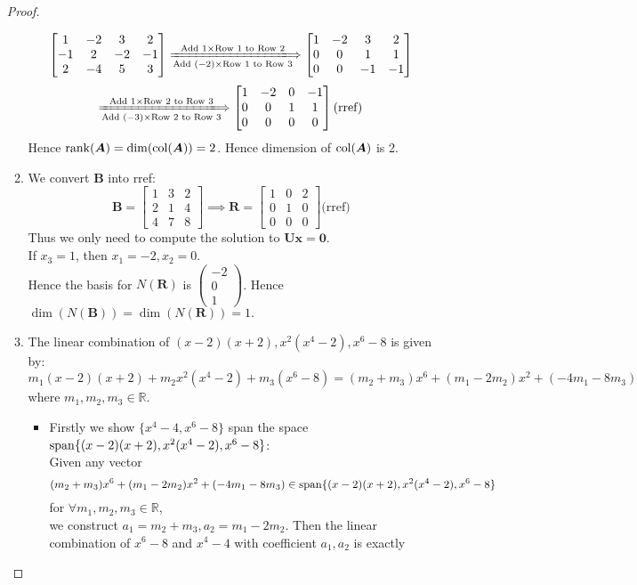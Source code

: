 \begin{enumerate}
\begin{proof}
\begin{enumerate}
\[\begin{bmatrix}
1&-2&3&2\\-1&2&-2&-1\\2&-4&5&3
\end{bmatrix}\xLongrightarrow[\text{Add $(-2)\times$Row 1 to Row 3}]{\text{Add $1\times$Row 1 to Row 2}}
\begin{bmatrix}
1&-2&3&2\\0&0&1&1\\0&0&-1&-1
\end{bmatrix}
\]
\[
\xLongrightarrow[\text{Add $(-3)\times$Row 2 to Row 3}]{\text{Add $1\times$Row 2 to Row 3}}
\begin{bmatrix}
1&-2&0&-1\\0&0&1&1\\0&0&0&0
\end{bmatrix}\text{(rref)}
\]
Hence $\operatorname{rank}(\bm A)=\dim(\operatorname{col}(\bm A)) =2$. Hence dimension of $\operatorname{col}(\bm A)$ is 2.
\item
We convert $\bm B$ into rref:
\[
\bm B=\begin{bmatrix}
1&3&2\\2&1&4\\4&7&8
\end{bmatrix}\implies
\bm R = \begin{bmatrix}
1&0&2\\0&1&0\\0&0&0
\end{bmatrix}\text{(rref)}
\]
Thus we only need to compute the solution to $\bm{Ux} = \bm 0$.\\
If $x_3=1$, then $x_1=-2,x_2=0$.\\
Hence the basis for $N(\bm R)$ is $\begin{pmatrix}
-2\\0\\1
\end{pmatrix}$. Hence $\dim(N(\bm B)) = \dim(N(\bm R))=1.$
\item
The linear combination of $(x-2)(x+2),x^2(x^4-2),x^6-8$ is given by:
\[
m_1(x-2)(x+2)+m_2x^2(x^4-2)+m_3(x^6-8) = (m_2+m_3)x^6 + (m_1-2m_2)x^2+(-4m_1-8m_3)
\]
where $m_1,m_2,m_3\in\mathbb{R}$.\\
\begin{itemize}
\item
Firstly we show $\{x^4-4,x^6-8\}$ span the space $\operatorname{span}\{(x-2)(x+2),x^2(x^4-2),x^6-8\}$:\\
Given any vector \[(m_2+m_3)x^6 + (m_1-2m_2)x^2+(-4m_1-8m_3)\in\operatorname{span}\{(x-2)(x+2),x^2(x^4-2),x^6-8\}\]  for $\forall m_1,m_2,m_3\in\mathbb{R}$,\\ we construct $a_1 = m_2+m_3,a_2=m_1-2m_2$. Then the linear combination of $x^6-8$ and $x^4-4$ with coefficient $a_1,a_2$ is exactly

\end{itemize}
\end{enumerate}
\end{proof}
\end{enumerate}
